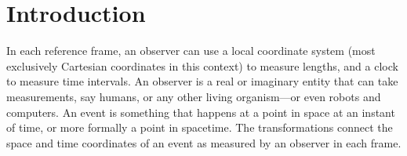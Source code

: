 \section{Introduction}
In each reference frame, an observer can use a local coordinate system (most exclusively Cartesian coordinates in this context) to measure lengths, and a clock to measure time intervals. An observer is a real or imaginary entity that can take measurements, say humans, or any other living organism—or even robots and computers. An event is something that happens at a point in space at an instant of time, or more formally a point in spacetime. The transformations connect the space and time coordinates of an event as measured by an observer in each frame.